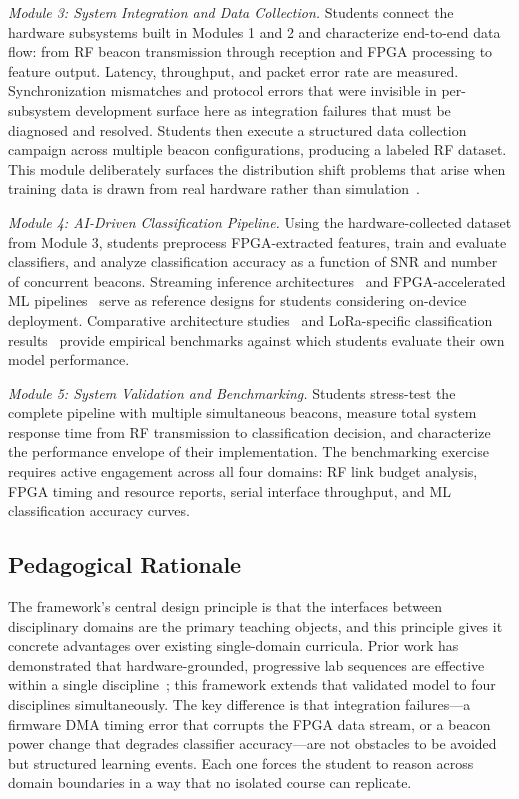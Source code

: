 \documentclass[conference]{IEEEtran}
\begin{document}
\textit{Module 3: System Integration and Data Collection.} Students connect the hardware subsystems built in Modules 1 and 2 and characterize end-to-end data flow: from RF beacon transmission through reception and FPGA processing to feature output. Latency, throughput, and packet error rate are measured. Synchronization mismatches and protocol errors that were invisible in per-subsystem development surface here as integration failures that must be diagnosed and resolved. Students then execute a structured data collection campaign across multiple beacon configurations, producing a labeled RF dataset. This module deliberately surfaces the distribution shift problems that arise when training data is drawn from real hardware rather than simulation~\cite{b6}.

\textit{Module 4: AI-Driven Classification Pipeline.} Using the hardware-collected dataset from Module 3, students preprocess FPGA-extracted features, train and evaluate classifiers, and analyze classification accuracy as a function of SNR and number of concurrent beacons. Streaming inference architectures~\cite{b3} and FPGA-accelerated ML pipelines~\cite{b2} serve as reference designs for students considering on-device deployment. Comparative architecture studies~\cite{b4} and LoRa-specific classification results~\cite{b5,b6,b8} provide empirical benchmarks against which students evaluate their own model performance.

\textit{Module 5: System Validation and Benchmarking.} Students stress-test the complete pipeline with multiple simultaneous beacons, measure total system response time from RF transmission to classification decision, and characterize the performance envelope of their implementation. The benchmarking exercise requires active engagement across all four domains: RF link budget analysis, FPGA timing and resource reports, serial interface throughput, and ML classification accuracy curves.

\subsection{Pedagogical Rationale}

The framework's central design principle is that the interfaces between disciplinary domains are the primary teaching objects, and this principle gives it concrete advantages over existing single-domain curricula. Prior work has demonstrated that hardware-grounded, progressive lab sequences are effective within a single discipline~\cite{b9,b10}; this framework extends that validated model to four disciplines simultaneously. The key difference is that integration failures---a firmware DMA timing error that corrupts the FPGA data stream, or a beacon power change that degrades classifier accuracy---are not obstacles to be avoided but structured learning events. Each one forces the student to reason across domain boundaries in a way that no isolated course can replicate.
\end{document}
